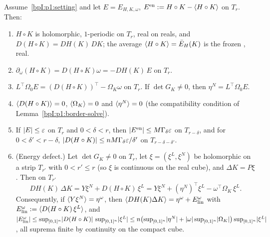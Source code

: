 \begin{lemma}\label{bpI:p1:energy-approx}
Assume~\ref{bpI:p1:setting} and let $E=E_{H,K,\omega}$, $E^{\mathrm{en}}:=H\circ K-\langle H\circ K\rangle$ on $T_r$. Then:
\begin{enumerate}[label=(\alph*)]
\item $H\circ K$ is holomorphic, $1$-periodic on $T_r$, real on reals, and $D(H\circ K)=DH(K)\,DK$; the average
  $\langle H\circ K\rangle=\bar E_H(K)$ is the frozen , real.
\item $\partial_\omega(H\circ K)=D(H\circ K)\omega=-DH(K)\,E$ on $T_r$.
\item $L^\top\Omega_0E=(D(H\circ K))^\top-\Omega_K\omega$ on $T_r$. If $\det G_K\ne0$, then $\eta^N=L^\top\Omega_0E$.
\item $\langle D(H\circ K)\rangle=0$, $\langle \Omega_K\rangle=0$ and $\langle \eta^N\rangle=0$ (the compatibility condition of Lemma~\ref{bpI:p1:border-solve}).
\item If $\lvert E\rvert\le\varepsilon$ on $T_r$ and $0<\delta<r$, then $\lvert E^{\mathrm{en}}\rvert\le M\Gamma_\delta\varepsilon$ on $T_{r-\delta}$, and for
  $0<\delta'<r-\delta$, $\lvert D(H\circ K)\rvert\le nM\Gamma_\delta\varepsilon/\delta'$ on $T_{r-\delta-\delta'}$.
\item (Energy defect.) Let $\det G_K\ne0$ on $T_r$, let $\xi=(\xi^L,\xi^N)$ be holomorphic on a strip $T_{r'}$ with $0<r'\le r$ (so $\xi$ is continuous on the real cube), and
  $\Delta K=P\xi$. Then on $T_{r'}$
  \[
  DH(K)\,\Delta K=Y\xi^N+D(H\circ K)\,\xi^L=Y\xi^N+(\eta^N)^\top\xi^L-\omega^\top\Omega_K\,\xi^L .
  \]
  Consequently, if $\langle Y\xi^N\rangle=\eta^\omega$, then $\langle DH(K)\Delta K\rangle=\eta^\omega+E^\omega_{\mathrm{lin}}$ with
  $E^\omega_{\mathrm{lin}}:=\langle D(H\circ K)\,\xi^L\rangle$, and
  $\lvert E^\omega_{\mathrm{lin}}\rvert\le\sup_{[0,1]^n}\lvert D(H\circ K)\rvert\,\sup_{[0,1]^n}\lvert \xi^L\rvert\le n\bigl(\sup_{[0,1]^n}\lvert \eta^N\rvert+\lvert \omega\rvert\sup_{[0,1]^n}\lvert \Omega_K\rvert\bigr)\sup_{[0,1]^n}\lvert \xi^L\rvert$, all suprema finite by continuity on the compact cube.
\end{enumerate}
\end{lemma}

